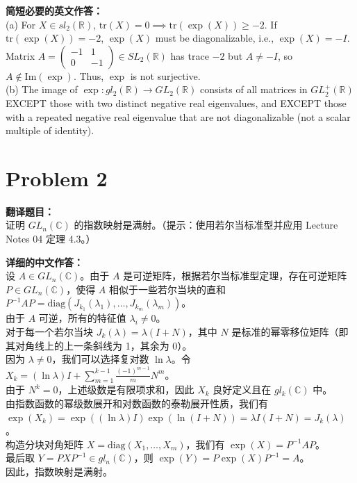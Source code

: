 \documentclass{ctexart}
\begin{document}
\vspace{1em}
\textbf{简短必要的英文作答：}\\
(a) For $X \in sl_2(\mathbb{R})$, $\text{tr}(X) = 0 \implies \text{tr}(\exp(X)) \ge -2$. If $\text{tr}(\exp(X)) = -2$, $\exp(X)$ must be diagonalizable, i.e., $\exp(X) = -I$. Matrix $A = \begin{pmatrix} -1 & 1 \\ 0 & -1 \end{pmatrix} \in SL_2(\mathbb{R})$ has trace $-2$ but $A \neq -I$, so $A \notin \text{Im}(\exp)$. Thus, $\exp$ is not surjective.\\
(b) The image of $\exp: gl_2(\mathbb{R}) \to GL_2(\mathbb{R})$ consists of all matrices in $GL_2^+(\mathbb{R})$ EXCEPT those with two distinct negative real eigenvalues, and EXCEPT those with a repeated negative real eigenvalue that are not diagonalizable (not a scalar multiple of identity).

\vspace{2em}
\section*{Problem 2}
\textbf{翻译题目：}\\
证明 $GL_n(\mathbb{C})$ 的指数映射是满射。（提示：使用若尔当标准型并应用 Lecture Notes 04 定理 4.3。）

\vspace{1em}
\textbf{详细的中文作答：}\\
设 $A \in GL_n(\mathbb{C})$。由于 $A$ 是可逆矩阵，根据若尔当标准型定理，存在可逆矩阵 $P \in GL_n(\mathbb{C})$，使得 $A$ 相似于一些若尔当块的直和 $P^{-1}AP = \text{diag}(J_{k_1}(\lambda_1), \dots, J_{k_m}(\lambda_m))$。\\
由于 $A$ 可逆，所有的特征值 $\lambda_i \neq 0$。\\
对于每一个若尔当块 $J_k(\lambda) = \lambda (I + N)$，其中 $N$ 是标准的幂零移位矩阵（即其对角线上的上一条斜线为 1，其余为 0）。\\
因为 $\lambda \neq 0$，我们可以选择复对数 $\ln\lambda$。令\\
$X_k = (\ln\lambda)I + \sum_{m=1}^{k-1} \frac{(-1)^{m-1}}{m} N^m$。\\
由于 $N^k = 0$，上述级数是有限项求和，因此 $X_k$ 良好定义且在 $gl_k(\mathbb{C})$ 中。\\
由指数函数的幂级数展开和对数函数的泰勒展开性质，我们有 $\exp(X_k) = \exp((\ln\lambda)I) \exp(\ln(I+N)) = \lambda I (I+N) = J_k(\lambda)$。\\
构造分块对角矩阵 $X = \text{diag}(X_1, \dots, X_m)$，我们有 $\exp(X) = P^{-1}AP$。\\
最后取 $Y = P X P^{-1} \in gl_n(\mathbb{C})$，则 $\exp(Y) = P \exp(X) P^{-1} = A$。\\
因此，指数映射是满射。
\end{document}
